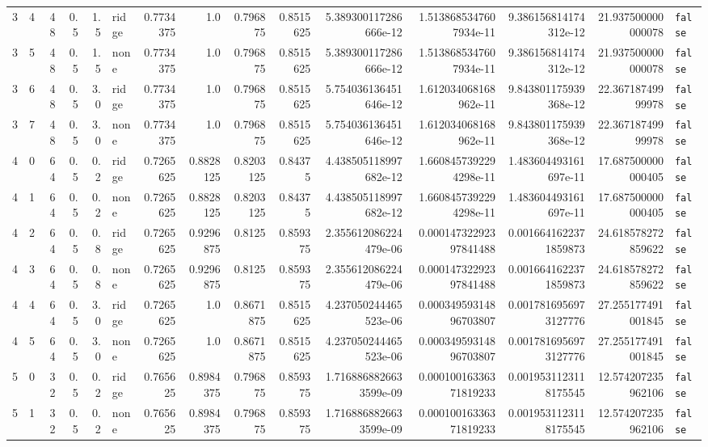 \documentclass[11pt,a4paper]{article}
\begin{document}
\begin{landscape}
\begin{longtable}{r r r r r l r r r r r r r r l}
3 & 4 & 48 & 0.5 & 1.5 & ridge & 0.7734375 & 1.0 & 0.796875 & 0.8515625 & 5.389300117286666e-12 & 1.5138685347607934e-11 & 9.386156814174312e-12 & 21.937500000000078 & \texttt{false} \\
3 & 5 & 48 & 0.5 & 1.5 & none & 0.7734375 & 1.0 & 0.796875 & 0.8515625 & 5.389300117286666e-12 & 1.5138685347607934e-11 & 9.386156814174312e-12 & 21.937500000000078 & \texttt{false} \\
3 & 6 & 48 & 0.5 & 3.0 & ridge & 0.7734375 & 1.0 & 0.796875 & 0.8515625 & 5.754036136451646e-12 & 1.612034068168962e-11 & 9.843801175939368e-12 & 22.36718749999978 & \texttt{false} \\
3 & 7 & 48 & 0.5 & 3.0 & none & 0.7734375 & 1.0 & 0.796875 & 0.8515625 & 5.754036136451646e-12 & 1.612034068168962e-11 & 9.843801175939368e-12 & 22.36718749999978 & \texttt{false} \\
4 & 0 & 64 & 0.5 & 0.2 & ridge & 0.7265625 & 0.8828125 & 0.8203125 & 0.84375 & 4.438505118997682e-12 & 1.6608457392294298e-11 & 1.483604493161697e-11 & 17.687500000000405 & \texttt{false} \\
4 & 1 & 64 & 0.5 & 0.2 & none & 0.7265625 & 0.8828125 & 0.8203125 & 0.84375 & 4.438505118997682e-12 & 1.6608457392294298e-11 & 1.483604493161697e-11 & 17.687500000000405 & \texttt{false} \\
4 & 2 & 64 & 0.5 & 0.8 & ridge & 0.7265625 & 0.9296875 & 0.8125 & 0.859375 & 2.355612086224479e-06 & 0.00014732292397841488 & 0.0016641622371859873 & 24.618578272859622 & \texttt{false} \\
4 & 3 & 64 & 0.5 & 0.8 & none & 0.7265625 & 0.9296875 & 0.8125 & 0.859375 & 2.355612086224479e-06 & 0.00014732292397841488 & 0.0016641622371859873 & 24.618578272859622 & \texttt{false} \\
4 & 4 & 64 & 0.5 & 3.0 & ridge & 0.7265625 & 1.0 & 0.8671875 & 0.8515625 & 4.237050244465523e-06 & 0.00034959314896703807 & 0.0017816956973127776 & 27.255177491001845 & \texttt{false} \\
4 & 5 & 64 & 0.5 & 3.0 & none & 0.7265625 & 1.0 & 0.8671875 & 0.8515625 & 4.237050244465523e-06 & 0.00034959314896703807 & 0.0017816956973127776 & 27.255177491001845 & \texttt{false} \\
5 & 0 & 32 & 0.5 & 0.2 & ridge & 0.765625 & 0.8984375 & 0.796875 & 0.859375 & 1.7168868826633599e-09 & 0.00010016336371819233 & 0.0019531123118175545 & 12.574207235962106 & \texttt{false} \\
5 & 1 & 32 & 0.5 & 0.2 & none & 0.765625 & 0.8984375 & 0.796875 & 0.859375 & 1.7168868826633599e-09 & 0.00010016336371819233 & 0.0019531123118175545 & 12.574207235962106 & \texttt{false} \\

\end{longtable}
\end{landscape}
\end{document}
